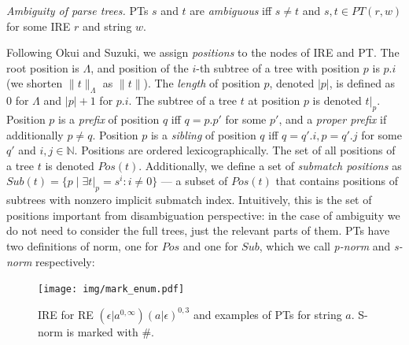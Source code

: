 \documentclass[AMA,STIX1COL]{WileyNJD-v2}
\newcommand{\XP}{\mathcal{P}}
\newcommand{\YN}{\mathbb{N}}
\newcommand{\PT}{PT}
\begin{document}
    \begin{definition}\label{ambiguity_of_parse_trees}
    \emph{Ambiguity of parse trees.}
    PTs $s$ and $t$ are \emph{ambiguous} iff $s \neq t$ and $s, t \in \PT(r, w)$ for some IRE $r$ and string $w$.
    \end{definition}

Following Okui and Suzuki, we assign \emph{positions} to the nodes of IRE and PT.
The root position is $\Lambda$, and position of the $i$-th subtree of a tree with position $p$ is $p.i$
(we shorten $\|t\|_\Lambda$ as $\|t\|$).
The \emph{length} of position $p$, denoted $|p|$, is defined as $0$ for $\Lambda$ and $|p| + 1$ for $p.i$.
The subtree of a tree $t$ at position $p$ is denoted $t|_p$.
Position $p$ is a \emph{prefix} of position $q$ iff $q = p.p'$ for some $p'$,
and a \emph{proper prefix} if additionally $p \neq q$.
Position $p$ is a \emph{sibling} of position $q$ iff $q = q'.i, p = q'.j$ for some $q'$ and $i,j \in \YN$.
Positions are ordered lexicographically.
The set of all positions of a tree $t$ is denoted $Pos(t)$.
Additionally, we define a set of \emph{submatch positions} as
$Sub(t) = \big\{ p \mid \exists t|_p = s^i : i \neq 0 \big\}$ ---
a subset of $Pos(t)$ that contains positions of subtrees with nonzero implicit submatch index.
Intuitively, this is the set of positions important from disambiguation perspective:
in the case of ambiguity we do not need to consider the full trees,
just the relevant parts of them.
%
PTs have two definitions of norm, one for $Pos$ and one for $Sub$,
which we call \emph{p-norm} and \emph{s-norm} respectively:

\begin{figure}
\texttt{[image: img/mark\_enum.pdf]}
\vspace{-2em}
\caption{
IRE for RE $(\epsilon|a^{0,\infty})(a|\epsilon)^{0,3}$
and examples of PTs for string $a$.
S-norm is marked with $\#$.
}\label{fig:mark_enum}
\end{figure}
\end{document}
